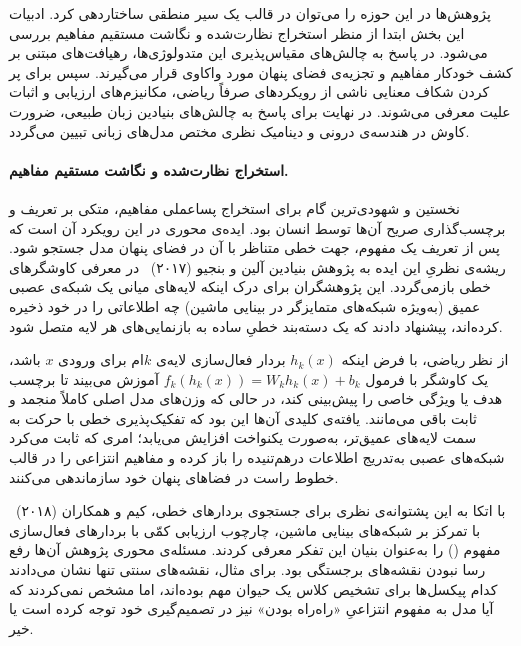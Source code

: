 پژوهش‌ها در این حوزه را می‌توان در قالب یک سیر منطقی ساختاردهی کرد. ادبیات این بخش ابتدا از منظر استخراج نظارت‌شده و نگاشت مستقیم مفاهیم بررسی می‌شود. در پاسخ به چالش‌های مقیاس‌پذیری این متدولوژی‌ها، رهیافت‌های مبتنی بر کشف خودکار مفاهیم و تجزیه‌ی فضای پنهان مورد واکاوی قرار می‌گیرند. سپس برای پر کردن شکاف معنایی ناشی از رویکردهای صرفاً ریاضی، مکانیزم‌های ارزیابی و اثبات علیت معرفی می‌شوند. در نهایت برای پاسخ به چالش‌های بنیادین زبان طبیعی، ضرورت کاوش در هندسه‌ی درونی و دینامیک نظری مختص مدل‌های زبانی تبیین می‌گردد.

\paragraph{استخراج نظارت‌شده و نگاشت مستقیم مفاهیم.}

نخستین و شهودی‌ترین گام برای استخراج پساعملی مفاهیم، متکی بر تعریف و برچسب‌گذاری صریح آن‌ها توسط انسان بود. ایده‌ی محوری در این رویکرد آن است که پس از تعریف یک مفهوم، جهت خطی متناظر با آن در فضای پنهان مدل جستجو شود. ریشه‌ی نظریِ این ایده به پژوهش بنیادین آلین و بنجیو (۲۰۱۷)~\cite{alain2017understanding} در معرفی کاوشگرهای خطی بازمی‌گردد. این پژوهشگران برای درک اینکه لایه‌های میانی یک شبکه‌ی عصبی عمیق (به‌ویژه شبکه‌های متمایزگر در بینایی ماشین) چه اطلاعاتی را در خود ذخیره کرده‌اند، پیشنهاد دادند که یک دسته‌بند خطیِ ساده به بازنمایی‌های هر لایه متصل شود.

از نظر ریاضی، با فرض اینکه $h_k(x)$ بردار فعال‌سازی لایه‌ی $k$ام برای ورودی $x$ باشد، یک کاوشگر با فرمول $f_k(h_k(x)) = W_k h_k(x) + b_k$ آموزش می‌بیند تا برچسب هدف یا ویژگی خاصی را پیش‌بینی کند، در حالی که وزن‌های مدل اصلی کاملاً منجمد و ثابت باقی می‌مانند. یافته‌ی کلیدی آن‌ها این بود که تفکیک‌پذیری خطی با حرکت به سمت لایه‌های عمیق‌تر، به‌صورت یکنواخت افزایش می‌یابد؛ امری که ثابت می‌کرد شبکه‌های عصبی به‌تدریج اطلاعات درهم‌تنیده را باز کرده و مفاهیم انتزاعی را در قالب خطوط راست در فضاهای پنهان خود سازماندهی می‌کنند.

با اتکا به این پشتوانه‌ی نظری برای جستجوی بردارهای خطی، کیم و همکاران (۲۰۱۸)~\cite{kim2018interpretability} با تمرکز بر شبکه‌های بینایی ماشین، چارچوب ارزیابی کمّی با بردارهای فعال‌سازی مفهوم () را به‌عنوان بنیان این تفکر معرفی کردند. مسئله‌ی محوری پژوهش آن‌ها رفع رسا نبودن نقشه‌های برجستگی بود. برای مثال، نقشه‌های سنتی تنها نشان می‌دادند کدام پیکسل‌ها برای تشخیص کلاس یک حیوان مهم بوده‌اند، اما مشخص نمی‌کردند که آیا مدل به مفهوم انتزاعیِ «راه‌راه بودن» نیز در تصمیم‌گیری خود توجه کرده است یا خیر.

